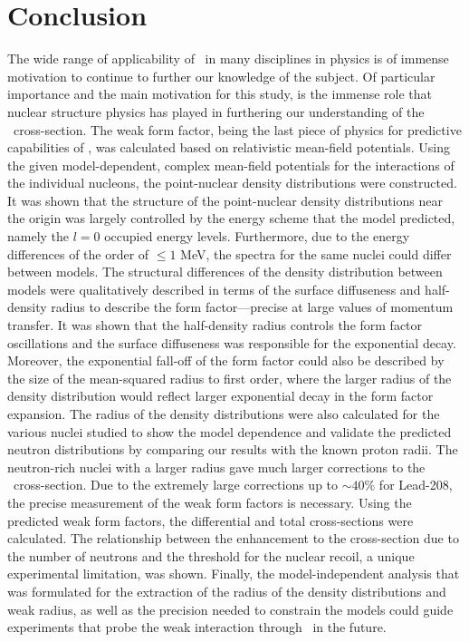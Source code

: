 \chapter{Conclusion}

The wide range of applicability of \cevns\ in many disciplines in physics is of immense motivation to continue to further our knowledge of the subject. Of particular importance and the main motivation for this study, is the immense role that nuclear structure physics has played in furthering our understanding of the \cevns\ cross-section. The weak form factor, being the last piece of physics for predictive capabilities of \cevns , was calculated based on relativistic mean-field potentials. Using the given model-dependent, complex mean-field potentials for the interactions of the individual nucleons, the point-nuclear density distributions were constructed. It was shown that the structure of the point-nuclear density distributions near the origin was largely controlled by the energy scheme that the model predicted, namely the $l=0$ occupied energy levels. Furthermore, due to the energy differences of the order of $\leq 1$ MeV, the spectra for the same nuclei could differ between models. The structural differences of the density distribution between models were qualitatively described in terms of the surface diffuseness and half-density radius to describe the form factor---precise at large values of momentum transfer. It was shown that the half-density radius controls the form factor oscillations and the surface diffuseness was responsible for the exponential decay. Moreover, the exponential fall-off of the form factor could also be described by the size of the mean-squared radius to first order, where the larger radius of the density distribution would reflect larger exponential decay in the form factor expansion. The radius of the density distributions were also calculated for the various nuclei studied to show the model dependence and validate the predicted neutron distributions by comparing our results with the known proton radii. The neutron-rich nuclei with a larger radius gave much larger corrections to the \cevns\ cross-section. Due to the extremely large corrections up to $\sim 40 \% $ for Lead-208, the precise measurement of the weak form factors is necessary. Using the predicted weak form factors, the differential and total cross-sections were calculated. The relationship between the enhancement to the cross-section due to the number of neutrons and the threshold for the nuclear recoil, a unique experimental limitation, was shown. Finally, the model-independent analysis that was formulated for the extraction of the radius of the density distributions and weak radius, as well as the precision needed to constrain the models could guide experiments that probe the weak interaction through \cevns\ in the future.  